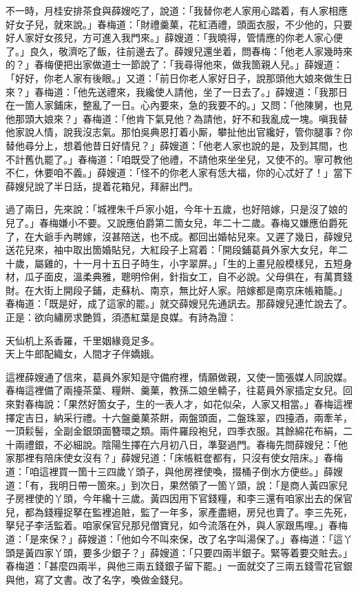 不一時，月桂安排茶食與薛嫂吃了，說道：「我替你老人家用心踏着，有人家相應好女子兒，就來說。」春梅道：「財禮羹菓，花紅酒禮，頭面衣服，不少他的，只要好人家好女孩兒，方可進入我門來。」薛嫂道：「我曉得，管情應的你老人家心便了。」良久，敬濟吃了飯，往前邊去了。薛嫂兒還坐着，問春梅：「他老人家幾時來的？」春梅便把出家做道士一節說了：「我尋得他來，做我箇親人兒。」薛嫂道：「好好，你老人家有後眼。」又道：「前日你老人家好日子，說那頭他大娘來做生日來？」春梅道：「他先送禮來，我纔使人請他，坐了一日去了。」薛嫂道：「我那日在一箇人家鋪床，整亂了一日。心內要來，急的我要不的。」又問：「他陳舅，也見他那頭大娘來？」春梅道：「他肯下氣見他？為請他，好不和我亂成一塊。嗔我替他家說人情，說我沒志氣。那怕吳典恩打着小厮，攀扯他出官纔好，管你腿事？你替他尋分上，想着他昔日好情兒？」薛嫂道：「他老人家也說的是，及到其間，也不計舊仇罷了。」春梅道：「咱既受了他禮，不請他來坐坐兒，又使不的。寧可教他不仁，休要咱不義。」薛嫂道：「怪不的你老人家有恁大福，你的心忒好了！」{}當下薛嫂兒說了半日話，提着花箱兒，拜辭出門。

過了兩日，先來說：「城裡朱千戶家小姐，今年十五歲，也好陪嫁，只是沒了娘的兒了。」春梅嫌小不要。又說應伯爵第二箇女兒，年二十二歲。春梅又嫌應伯爵死了，{}在大爺手內聘嫁，沒甚陪送，也不成。都回出婚帖兒來。又遲了幾日，薛嫂兒送花兒來，袖中取出箇婚貼兒，大紅段子上寫着：「開段鋪葛員外家大女兒，年二十歲，屬雞的，十一月十五日子時生，小字翠屏。」「生的上畫兒般模樣兒，五短身材，瓜子面皮，溫柔典雅，聰明伶俐，針指女工，自不必說。父母俱在，有萬貫錢財。在大街上開段子鋪，走蘇杭、南京，無比好人家。陪嫁都是南京床帳箱籠。」春梅道：「既是好，成了這家的罷。」就交薛嫂兒先通訊去。那薛嫂兒連忙說去了。正是：欲向繡房求艷質，須憑紅葉是良媒。有詩為證：

\begin{myquote}
天仙机上系香羅，千里姻緣竟足多。\\天上牛郎配織女，人間才子伴嬌娥。
\end{myquote}

這裡薛嫂通了信來，葛員外家知是守備府裡，情願做親，又使一箇張媒人同說媒。春梅這裡備了兩擡茶葉、糧餅、羹菓，教孫二娘坐轎子，往葛員外家插定女兒。回來對春梅說：「果然好箇女子，生的一表人才，如花似朵，人家又相當。」春梅這裡擇定吉日，納采行禮。十六盤羹菓茶餅，兩盤頭面，二盤珠翠，四擡酒，兩牽羊，一頂鬏髻，全副金銀頭面簪環之類。兩件羅段袍兒，四季衣服。其餘綿花布絹，二十兩禮銀，不必細說。陰陽生擇在六月初八日，準娶過門。春梅先問薛嫂兒：「他家那裡有陪床使女沒有？」薛嫂兒道：「床帳粧奩都有，只沒有使女陪床。」春梅道：「咱這裡買一箇十三四歲丫頭子，與他房裡使喚，掇桶子倒水方便些。」薛嫂道：「有，我明日帶一箇來。」到次日，果然領了一箇丫頭，說：「是商人黃四家兒子房裡使的丫頭，今年纔十三歲。黃四因用下官錢糧，和李三還有咱家出去的保官兒，都為錢糧捉拏在監裡追賍，監了一年多，家產盡絕，房兒也賣了。李三先死，拏兒子李活監着。咱家保官兒那兒僧寶兒，如今流落在外，與人家跟馬哩。」{}春梅道：「是來保？」薛嫂道：「他如今不叫來保，改了名字叫湯保了。」春梅道：「這丫頭是黃四家丫頭，要多少銀子？」薛嫂道：「只要四兩半銀子。緊等着要交賍去。」春梅道：「甚麼四兩半，與他三兩五錢銀子留下罷。」一面就交了三兩五錢雪花官銀與他，寫了文書。改了名字，喚做金錢兒。

